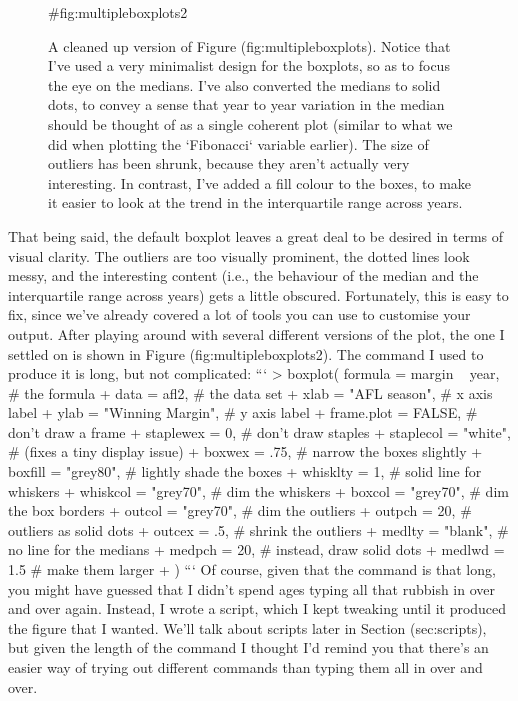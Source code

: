 \begin{figure}[t]
\begin{center}
\caption{A cleaned up version of Figure \@ref(fig:multipleboxplots). Notice that I've used a very minimalist design for the boxplots, so as to focus the eye on the medians. I've also converted the medians to solid dots, to convey a sense that year to year variation in the median should be thought of as a single coherent plot (similar to what we did when plotting the `Fibonacci` variable earlier). The size of outliers has been shrunk, because they aren't actually very interesting. In contrast, I've added a fill colour to the boxes, to make it easier to look at the trend in the interquartile range across years. }
\HR
{#fig:multipleboxplots2}
\end{center}
\end{figure}


That being said, the default boxplot leaves a great deal to be desired in terms of visual clarity. The outliers are too visually prominent, the dotted lines look messy, and the interesting content (i.e., the behaviour of the median and the interquartile range across years) gets a little obscured. Fortunately, this is easy to fix, since we've already covered a lot of tools you can use to customise your output. After playing around with several different versions of the plot, the one I settled on is shown in Figure \@ref(fig:multipleboxplots2). The command I used to produce it is long, but not complicated:
```
>  boxplot( formula =  margin ~ year,   # the formula
+           data = afl2,                # the data set
+           xlab = "AFL season",        # x axis label
+           ylab = "Winning Margin",    # y axis label
+           frame.plot = FALSE,         # don't draw a frame
+           staplewex = 0,              # don't draw staples
+           staplecol = "white",        # (fixes a tiny display issue)
+           boxwex = .75,               # narrow the boxes slightly
+           boxfill = "grey80",         # lightly shade the boxes
+           whisklty = 1,               # solid line for whiskers 
+           whiskcol = "grey70",        # dim the whiskers
+           boxcol = "grey70",          # dim the box borders
+           outcol = "grey70",          # dim the outliers
+           outpch = 20,                # outliers as solid dots
+           outcex = .5,                # shrink the outliers
+           medlty = "blank",           # no line for the medians
+           medpch = 20,                # instead, draw solid dots
+           medlwd = 1.5                # make them larger
+ )
``` 
Of course, given that the command is that long, you might have guessed that I didn't spend ages typing all that rubbish in over and over again. Instead, I wrote a script, which I kept tweaking until it produced the figure that I wanted. We'll talk about scripts later in Section \@ref(sec:scripts), but given the length of the command I thought I'd remind you that there's an easier way of trying out different commands than typing them all in over and over.



